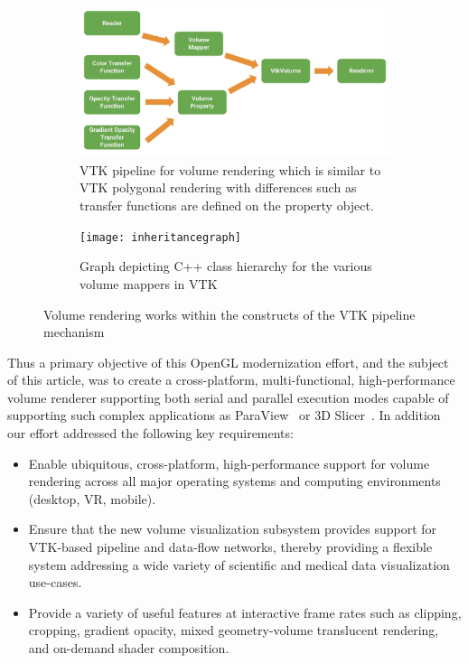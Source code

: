 \begin{figure}
  \centering
  \begin{subfigure}[b]{\columnwidth}
    \centering
    \includegraphics[width=\columnwidth, height=0.4\textheight]{vtk_volume_pipeline}
    \caption{VTK pipeline for volume rendering which is similar to VTK polygonal
      rendering with differences such as transfer functions are defined on the
      property object.}
    \label{fig:pipeline}
  \end{subfigure}\vfill
  \begin{subfigure}[b]{\columnwidth}
    \centering
    \texttt{[image: inheritancegraph]}
    \caption{Graph depicting C++ class hierarchy for
      the various volume mappers in VTK}
    \label{fig:inheritancegraph}
  \end{subfigure}
  \caption{Volume rendering works within the constructs of the VTK pipeline
    mechanism}
  \label{fig:pipeline-inheritancegraph}
\end{figure}

Thus a primary objective of this OpenGL modernization effort, and the
subject of this article, was to create a cross-platform, multi-functional,
high-performance volume renderer supporting both serial and parallel execution
modes capable of supporting such complex applications as
ParaView~\citep{ahrens_paraview:_2005,ayachit_paraview_2015} or 3D
Slicer~\citep{fedorov_3d_2012}.
In addition our effort addressed the following key requirements:

\begin{itemize}
  \item Enable ubiquitous, cross-platform, high-performance support for volume
    rendering across all major operating systems and computing environments
    (desktop, VR, mobile).

  \item Ensure that the new volume visualization subsystem provides support for
    VTK-based pipeline and data-flow networks, thereby providing a flexible
    system addressing a wide variety of scientific and medical data
    visualization use-cases.

  \item Provide a variety of useful features at interactive frame rates such as
    clipping, cropping, gradient opacity, mixed geometry-volume translucent
    rendering, and on-demand shader composition.
\end{itemize}

